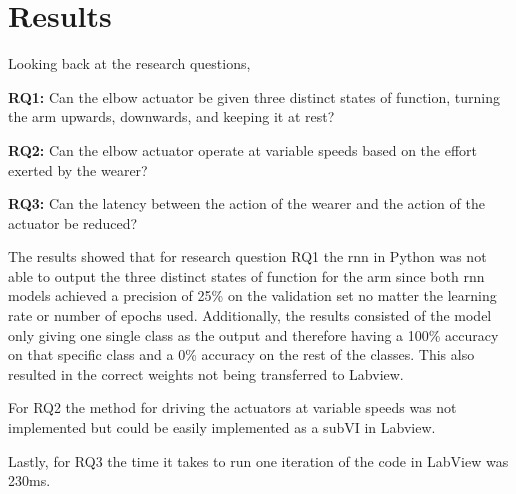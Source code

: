 \section{Results}
\label{section:results}

%
%
%
Looking back at the research questions,

\textbf{RQ1:} Can the elbow actuator be given three distinct states of function, turning the arm upwards, downwards, and keeping it at rest?

\textbf{RQ2:} Can the elbow actuator operate at variable speeds based on the effort exerted by the wearer?

\textbf{RQ3:} Can the latency between the action of the wearer and the action of the actuator be reduced?

The results showed that for research question RQ1 the \acrshort{rnn} in Python was not able to output the three distinct states of 
function for the arm since both \acrshort{rnn} models achieved a precision of 25\% on the validation set no matter the
learning rate or number of epochs used. Additionally, the results consisted of the model only giving one single class as the output
and therefore having a 100\% accuracy on that specific class and a 0\% accuracy on the rest of the classes. This also resulted in 
the correct weights not being transferred to Labview.

For RQ2 the method for driving the actuators at variable speeds was not implemented but could be easily implemented as a subVI in Labview.  

Lastly, for RQ3 the time it takes to run one iteration of the code in LabView was 230ms.